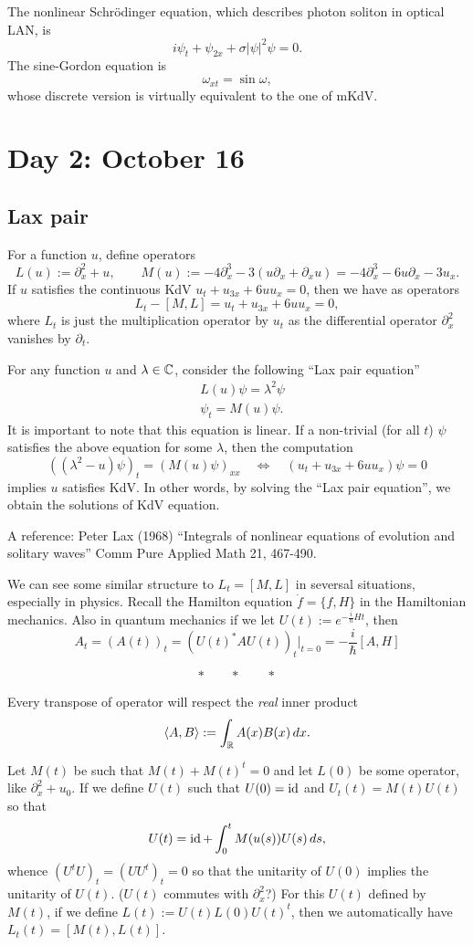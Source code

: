 \documentclass{../../../small}
\begin{document}
The nonlinear Schr\"odinger equation, which describes photon soliton in optical LAN, is
\[i\psi_t+\psi_{2x}+\sigma|\psi|^2\psi=0.\]
The sine-Gordon equation is
\[\omega_{xt}=\sin\omega,\]
whose discrete version is virtually equivalent to the one of mKdV.

\newpage
\section{Day 2: October 16}
\subsection*{Lax pair}
For a function $u$, define operators
\[L(u):=\partial_x^2+u,\qquad M(u):=-4\partial_x^3-3(u\partial_x+\partial_xu)=-4\partial_x^3-6u\partial_x-3u_x.\]
If $u$ satisfies the continuous KdV $u_t+u_{3x}+6uu_x=0$, then we have as operators
\[L_t-[M,L]=u_t+u_{3x}+6uu_x=0,\]
where $L_t$ is just the multiplication operator by $u_t$ as the differential operator $\partial_x^2$ vanishes by $\partial_t$.

For any function $u$ and $\lambda\in\mathbb{C}$, consider the following ``Lax pair equation''
\begin{align*}
&L(u)\psi=\lambda^2\psi\\
&\psi_t=M(u)\psi.
\end{align*}
It is important to note that this equation is linear.
If a non-trivial (for all $t$) $\psi$ satisfies the above equation for some $\lambda$, then the computation
\[((\lambda^2-u)\psi)_t=(M(u)\psi)_{xx}\quad\Leftrightarrow\quad(u_t+u_{3x}+6uu_x)\psi=0\]
implies $u$ satisfies KdV.
In other words, by solving the ``Lax pair equation'', we obtain the solutions of KdV equation.

A reference: Peter Lax (1968) ``Integrals of nonlinear equations of evolution and solitary waves'' Comm Pure Applied Math 21, 467-490.

We can see some similar structure to $L_t=[M,L]$ in seversal situations, especially in physics.
Recall the Hamilton equation $\dot f=\{f,H\}$ in the Hamiltonian mechanics.
Also in quantum mechanics if we let $U(t):=e^{-\frac i\hbar Ht}$, then
\[A_t=(A(t))_t=(U(t)^*AU(t))_t|_{t=0}=-\frac i\hbar[A,H]\]

\[*\qquad*\qquad*\]
\smallskip

Every transpose of operator will respect the \emph{real} inner product
\[\langle A,B\rangle:=\int_{\mathbb{R}} A(x)B(x)\,dx.\]

Let $M(t)$ be such that $M(t)+M(t)^t=0$ and let $L(0)$ be some operator, like $\partial_x^2+u_0$.
If we define $U(t)$ such that $U(0)=\operatorname{id}$ and $U_t(t)=M(t)U(t)$ so that
\[U(t)=\operatorname{id}+\int_0^tM(u(s))U(s)\,ds,\]
whence $(U^tU)_t=(UU^t)_t=0$ so that the unitarity of $U(0)$ implies the unitarity of $U(t)$.
($U(t)$ commutes with $\partial_x^2$?)
For this $U(t)$ defined by $M(t)$, if we define $L(t):=U(t)L(0)U(t)^t$, then we automatically have $L_t(t)=[M(t),L(t)]$.
\end{document}
